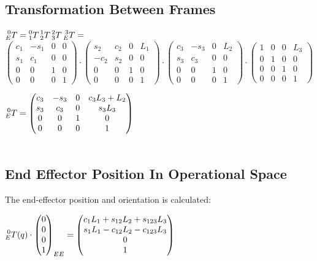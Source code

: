 \documentclass[a4paper,10pt]{article}
\begin{document}
\subsection{Transformation Between Frames}
$\prescript{0}{E}{T}=\prescript{0}{1}{T} \prescript{1}{2}{T} \prescript{2}{3}{T} \prescript{3}{E}{T}=
$$
\begin{pmatrix} 
c_1 & -s_1  & 0 & 0\\
s_1 & c_1 & 0 & 0 \\
0 & 0 & 1 & 0 \\
0 & 0 & 0 & 1 
\end{pmatrix}
\cdot
\begin{pmatrix} 
s_2 & c_2 & 0 & L_1 \\
-c_2 & s_2 & 0 & 0 \\
0 & 0 & 1 & 0 \\
0 & 0 & 0 & 1
\end{pmatrix}
\cdot
\begin{pmatrix} 
c_3 & -s_3 & 0 & L_2 \\
s_3 & c_3 & 0 & 0 \\
0 & 0 & 1 & 0 \\
0 & 0 & 0 & 1
\end{pmatrix}
\cdot
\begin{pmatrix} 
1 & 0 & 0 & L_3 \\
0 & 1 & 0 & 0 \\
0 & 0 & 1 & 0 \\
0 & 0 & 0 & 1
\end{pmatrix}
$$
$

$
\prescript{0}{E}{T}=
\begin{pmatrix} 
c_3 & -s_3 & 0 & c_3L_3+L_2 \\
s_3 & c_3 & 0 & s_3L_3 \\
0 & 0 & 1 & 0 \\
0 & 0 & 0 & 1
\end{pmatrix}
$
\\~\\

\subsection{End Effector Position In Operational Space}

The end-effector position and orientation is calculated:

$
\prescript{0}{E}{T}(q)\cdot
\begin{pmatrix} 
0 \\
0 \\
0 \\
1
\end{pmatrix}_{EE}
=
\begin{pmatrix} 
c_1L_1 + s_{12}L_2 + s_{123}L_3 \\
s_1L_1 - c_{12}L_2 - c_{123}L_3 \\
0 \\
1
\end{pmatrix}
$
\end{document}
